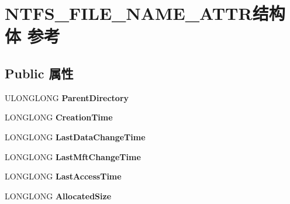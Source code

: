 \hypertarget{struct_n_t_f_s___f_i_l_e___n_a_m_e___a_t_t_r}{}\section{N\+T\+F\+S\+\_\+\+F\+I\+L\+E\+\_\+\+N\+A\+M\+E\+\_\+\+A\+T\+T\+R结构体 参考}
\label{struct_n_t_f_s___f_i_l_e___n_a_m_e___a_t_t_r}
\subsection*{Public 属性}
\begin{DoxyCompactItemize}
\item 
\mbox{\label{struct_n_t_f_s___f_i_l_e___n_a_m_e___a_t_t_r_a44ff3a5664b0a9b1afa940026200b484}} 
U\+L\+O\+N\+G\+L\+O\+NG {\bfseries Parent\+Directory}
\item 
\mbox{\label{struct_n_t_f_s___f_i_l_e___n_a_m_e___a_t_t_r_a37e2c7614f4cad647e2c4b850ef3a420}} 
L\+O\+N\+G\+L\+O\+NG {\bfseries Creation\+Time}
\item 
\mbox{\label{struct_n_t_f_s___f_i_l_e___n_a_m_e___a_t_t_r_ab28250c1e7dd979b7a77141499b4bd21}} 
L\+O\+N\+G\+L\+O\+NG {\bfseries Last\+Data\+Change\+Time}
\item 
\mbox{\label{struct_n_t_f_s___f_i_l_e___n_a_m_e___a_t_t_r_ac87e97492830a2e3e9a9d2e577ca2c14}} 
L\+O\+N\+G\+L\+O\+NG {\bfseries Last\+Mft\+Change\+Time}
\item 
\mbox{\label{struct_n_t_f_s___f_i_l_e___n_a_m_e___a_t_t_r_a3268bb1e438bdf0a77bf52c0c1ab5f2a}} 
L\+O\+N\+G\+L\+O\+NG {\bfseries Last\+Access\+Time}
\item 
\mbox{\label{struct_n_t_f_s___f_i_l_e___n_a_m_e___a_t_t_r_afedb001d53a20de8fc01a32311c9f349}} 
L\+O\+N\+G\+L\+O\+NG {\bfseries Allocated\+Size}
\item 
\mbox{\label{struct_n_t_f_s___f_i_l_e___n_a_m_e___a_t_t_r_a3137e909882c8927352ebc40f49f7d74}} 

\end{DoxyCompactItemize}
